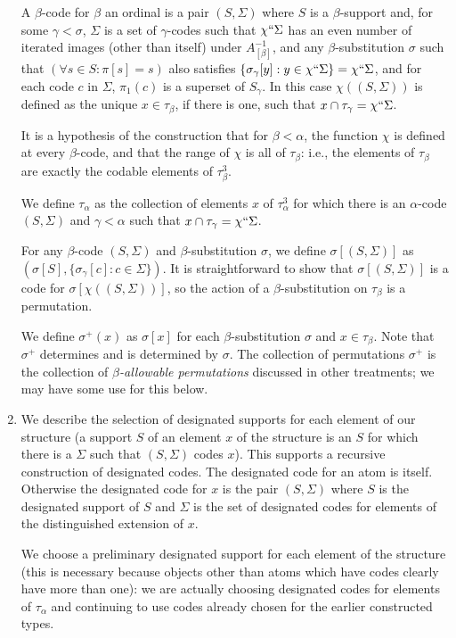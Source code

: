 \documentclass[12pt]{article}
\begin{document}
\begin{enumerate}
A  $\beta$-code for $\beta$ an ordinal is a pair $(S,\Sigma)$ where $S$ is a $\beta$-support and, for some $\gamma<\sigma$, $\Sigma$ is a set of $\gamma$-codes such that $\chi``\Sigma$ has an even number of iterated images (other than itself) under $A_{[\beta]}^{-1}$, and any $\beta$-substitution $\sigma$ such that $(\forall s \in S:\pi[s]=s)$ also
satisfies $\{\sigma_\gamma[y]:y \in \chi``\Sigma\} = \chi``\Sigma$, and for each code $c$ in $\Sigma$, $\pi_1(c)$ is a superset of $S_\gamma$.  In this case $\chi((S,\Sigma))$ is defined as the unique $x\in \tau_\beta$, if there is one, such that $x \cap \tau_\gamma = \chi``\Sigma$.

It is a hypothesis of the construction that for $\beta<\alpha$, the function $\chi$ is defined at every $\beta$-code, and that the range of $\chi$ is all of $\tau_\beta$:  i.e., the elements of $\tau_\beta$ are exactly the codable elements of $\tau^3_\beta$.

We define $\tau_\alpha$ as the collection of elements $x$ of $\tau^3_\alpha$ for which there is an $\alpha$-code $(S,\Sigma)$ and $\gamma<\alpha$ such that $x \cap \tau_\gamma = \chi``\Sigma$.

For any $\beta$-code $(S,\Sigma)$ and $\beta$-substitution $\sigma$, we define $\sigma[(S,\Sigma)]$ as $(\sigma[S],\{\sigma_\gamma[c]:c \in \Sigma\})$.  It  is straightforward to show that $\sigma[(S,\Sigma)]$ is a code for $\sigma[\chi((S,\Sigma))]$, so the action of a $\beta$-substitution on $\tau_\beta$ is a permutation.

We define $\sigma^+(x)$ as $\sigma[x]$ for each $\beta$-substitution $\sigma$ and $x \in \tau_\beta$.  Note that $\sigma^+$ determines and is determined by $\sigma$.  The collection of permutations $\sigma^+$  is the collection of {\em $\beta$-allowable permutations\/} discussed in other treatments;
we may have some use for this below.


\item We describe the selection of designated supports for each element of our structure (a support $S$ of an element $x$ of the structure is an $S$ for which there is a $\Sigma$ such that $(S,\Sigma)$ codes $x$).  This supports a recursive construction of designated codes.
The designated code for an atom is itself.  Otherwise the designated code for $x$ is the pair $(S,\Sigma)$ where $S$ is the designated support of $S$ and $\Sigma$ is the set of designated codes for elements of the distinguished extension of $x$.

We choose a preliminary designated support for each element of the structure (this is necessary because objects other than atoms which have codes clearly have more than one):  we are actually
choosing designated codes for elements of $\tau_\alpha$ and continuing to use codes already chosen for the earlier constructed types.


\end{enumerate}
\end{document}

